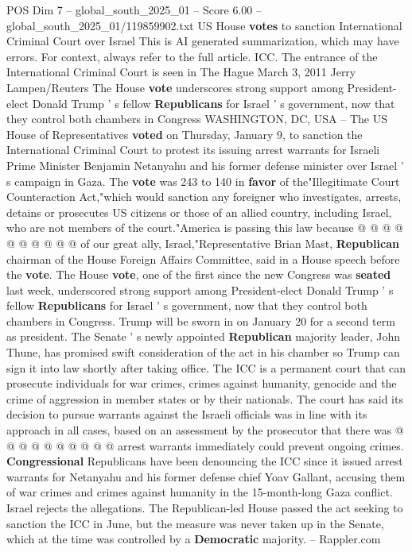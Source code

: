 \begin{textsample}{POS Dim 7 – global\_south\_2025\_01 – Score 6.00 – global\_south\_2025\_01/119859902.txt}  \label{ex:f7_pos_342}
US House \textbf{votes} to sanction International Criminal Court over Israel This is AI generated summarization, which may have errors.
For context, always refer to the full article.
ICC.
The entrance of the International Criminal Court is seen in The Hague March 3, 2011 Jerry Lampen/Reuters The House \textbf{vote} underscores strong support among President-elect Donald Trump ' s fellow \textbf{Republicans} for Israel ' s government, now that they control both chambers in Congress WASHINGTON, DC, USA -- The US House of Representatives \textbf{voted} on Thursday, January 9, to sanction the International Criminal Court to protest its issuing arrest warrants for Israeli Prime Minister Benjamin Netanyahu and his former defense minister over Israel ' s campaign in Gaza.
The \textbf{vote} was 243 to 140 in \textbf{favor} of the"Illegitimate Court Counteraction Act,"which would sanction any foreigner who investigates, arrests, detains or prosecutes US citizens or those of an allied country, including Israel, who are not members of the court."America is passing this law because @ @ @ @ @ @ @ @ @ @ of our great ally, Israel,"Representative Brian Mast, \textbf{Republican} chairman of the House Foreign Affairs Committee, said in a House speech before the \textbf{vote}.
The House \textbf{vote}, one of the first since the new Congress was \textbf{seated} last week, underscored strong support among President-elect Donald Trump ' s fellow \textbf{Republicans} for Israel ' s government, now that they control both chambers in Congress.
Trump will be sworn in on January 20 for a second term as president.
The Senate ' s newly appointed \textbf{Republican} majority leader, John Thune, has promised swift consideration of the act in his chamber so Trump can sign it into law shortly after taking office.
The ICC is a permanent court that can prosecute individuals for war crimes, crimes against humanity, genocide and the crime of aggression in member states or by their nationals.
The court has said its decision to pursue warrants against the Israeli officials was in line with its approach in all cases, based on an assessment by the prosecutor that there was @ @ @ @ @ @ @ @ @ @ arrest warrants immediately could prevent ongoing crimes. \textbf{Congressional} Republicans have been denouncing the ICC since it issued arrest warrants for Netanyahu and his former defense chief Yoav Gallant, accusing them of war crimes and crimes against humanity in the 15-month-long Gaza conflict.
Israel rejects the allegations.
The Republican-led House passed the act seeking to sanction the ICC in June, but the measure was never taken up in the Senate, which at the time was controlled by a \textbf{Democratic} majority. -- Rappler.com

\end{textsample}
